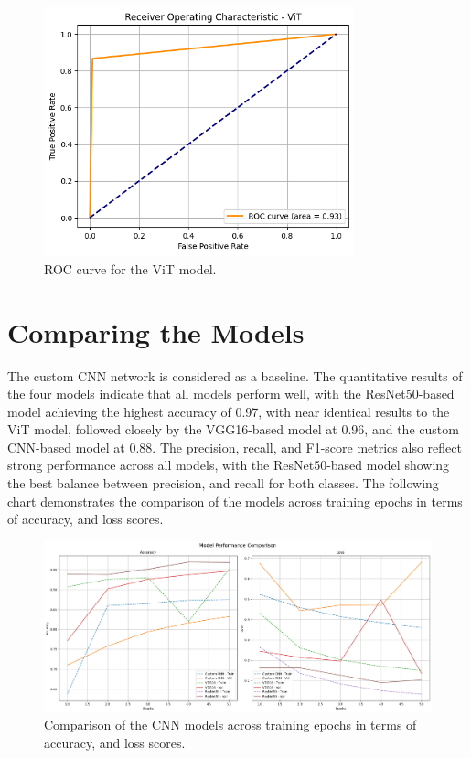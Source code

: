 \documentclass[../main]{subfiles}
\begin{document}
\begin{figure}[h]
	\centering
	\includegraphics[width=0.8\textwidth]{assets/roc_vit.png}
	\caption{ROC curve for the ViT model.}
    \label{fig:roc-vit}
\end{figure}

\section{Comparing the Models}
\label{sec:comparing-models}
The custom CNN network is considered as a baseline. The quantitative results of the four models indicate that all models perform well, with the ResNet50-based model achieving the highest accuracy of 0.97, with near identical results to the ViT model, followed closely by the VGG16-based model at 0.96, and the custom CNN-based model at 0.88. The precision, recall, and F1-score metrics also reflect strong performance across all models, with the ResNet50-based model showing the best balance between precision, and recall for both classes. The following chart demonstrates the comparison of the models across training epochs in terms of accuracy, and loss scores.

\begin{figure}[h]
    \centering
    \includegraphics[width=1\textwidth]{assets/comparison.png}
    \caption{Comparison of the CNN models across training epochs in terms of accuracy, and loss scores.}
    \label{fig:comparison-models}
\end{figure}
\end{document}
